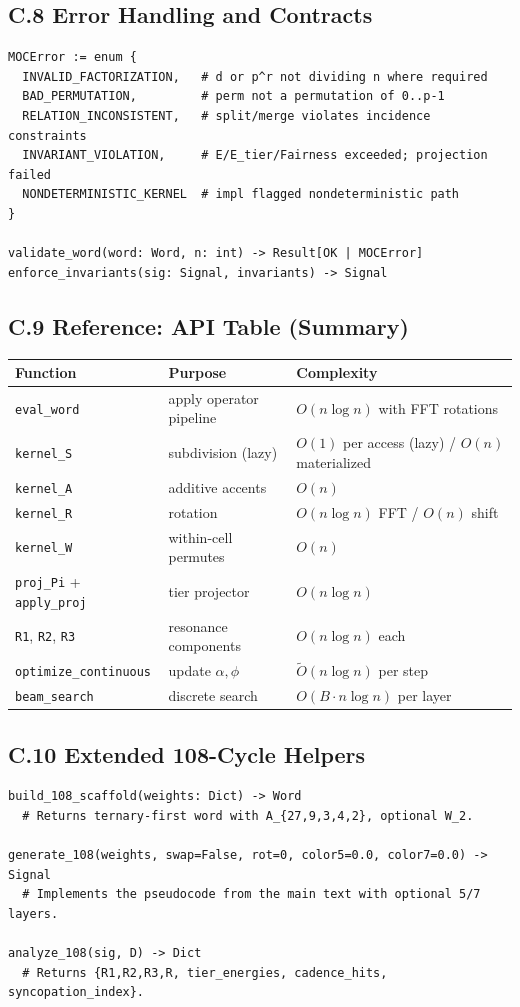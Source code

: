 \documentclass[12pt]{article}
\numberwithin{equation}{section}
\theoremstyle{plain}
\theoremstyle{definition}
\theoremstyle{remark}
\begin{document}
\subsection*{C.8 Error Handling and Contracts}
\begin{verbatim}
MOCError := enum {
  INVALID_FACTORIZATION,   # d or p^r not dividing n where required
  BAD_PERMUTATION,         # perm not a permutation of 0..p-1
  RELATION_INCONSISTENT,   # split/merge violates incidence constraints
  INVARIANT_VIOLATION,     # E/E_tier/Fairness exceeded; projection failed
  NONDETERMINISTIC_KERNEL  # impl flagged nondeterministic path
}

validate_word(word: Word, n: int) -> Result[OK | MOCError]
enforce_invariants(sig: Signal, invariants) -> Signal
\end{verbatim}

\subsection*{C.9 Reference: API Table (Summary)}
\begin{center}
\begin{tabular}{lll}
\hline
Function & Purpose & Complexity \\
\hline
\texttt{eval\_word} & apply operator pipeline & $O(n\log n)$ with FFT rotations \\
\texttt{kernel\_S} & subdivision (lazy) & $O(1)$ per access (lazy) / $O(n)$ materialized \\
\texttt{kernel\_A} & additive accents & $O(n)$ \\
\texttt{kernel\_R} & rotation & $O(n\log n)$ FFT / $O(n)$ shift \\
\texttt{kernel\_W} & within-cell permutes & $O(n)$ \\
\texttt{proj\_Pi} + \texttt{apply\_proj} & tier projector & $O(n\log n)$ \\
\texttt{R1}, \texttt{R2}, \texttt{R3} & resonance components & $O(n\log n)$ each \\
\texttt{optimize\_continuous} & update $\alpha,\phi$ & $\tilde{O}(n\log n)$ per step \\
\texttt{beam\_search} & discrete search & $O(B\cdot n\log n)$ per layer \\
\hline
\end{tabular}
\end{center}

\subsection*{C.10 Extended 108-Cycle Helpers}
\begin{verbatim}
build_108_scaffold(weights: Dict) -> Word
  # Returns ternary-first word with A_{27,9,3,4,2}, optional W_2.

generate_108(weights, swap=False, rot=0, color5=0.0, color7=0.0) -> Signal
  # Implements the pseudocode from the main text with optional 5/7 layers.

analyze_108(sig, D) -> Dict
  # Returns {R1,R2,R3,R, tier_energies, cadence_hits, syncopation_index}.
\end{verbatim}
\end{document}

